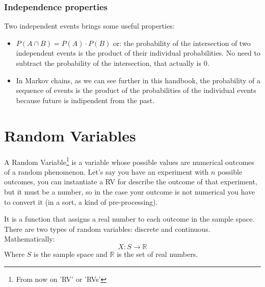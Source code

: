 \documentclass[a4paper]{article}
\begin{document}
\subsubsection{Independence properties}
Two independent events brings some useful properties:
\begin{itemize}
    \item \(P(A\cap B) = P(A)\cdot P(B)\) or: the probability of the intersection of two independent events is the product of their individual probabilities. No need to subtract the probability of the intersection, that actually is 0.
    \item In Markov chains, as we can see further in this handbook, the probability of a sequence of events is the product of the probabilities of the individual events because future is indipendent from the past.
\end{itemize}


\section{Random Variables}
A Random Variable\footnote{From now on 'RV' or 'RVs'} is a variable whose possible values are numerical outcomes of a random phenomenon. 
Let's say you have an experiment with $n$ possible outcomes, you can instantiate a RV for describe the outcome of that experiment, but it must be a number, so in the case your outcome is not numerical you have to convert it (in a sort, a kind of pre-processing). 

It is a function that assigns a real number to each outcome in the sample space. There are two types of random variables: discrete and continuous. Mathematically:
$$ X: S \rightarrow \mathbb{R} $$
Where \( S \) is the sample space and \( \mathbb{R} \) is the set of real numbers.
\end{document}
